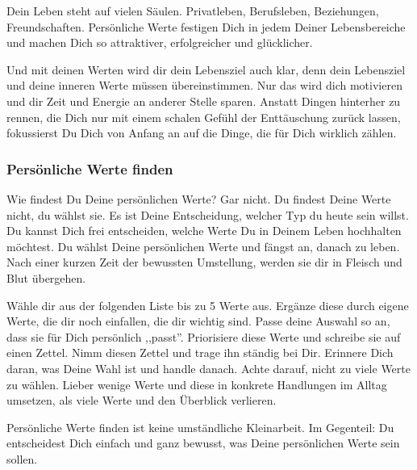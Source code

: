 \documentclass[../Lebensziel.tex]{subfiles}
\begin{document}
Dein Leben steht auf vielen Säulen. Privatleben, Berufsleben, Beziehungen, Freundschaften. Persönliche Werte festigen Dich in jedem Deiner Lebensbereiche und machen Dich so attraktiver, erfolgreicher und glücklicher.

Und mit deinen Werten wird dir dein Lebensziel auch klar, denn dein Lebensziel und deine inneren Werte müssen übereinstimmen. Nur das wird dich motivieren und dir Zeit und Energie an anderer Stelle sparen. Anstatt Dingen hinterher zu rennen, die Dich nur mit einem schalen Gefühl der Enttäuschung zurück lassen, fokussierst Du Dich von Anfang an auf die Dinge, die für Dich wirklich zählen.

\subsubsection{Persönliche Werte finden}
Wie findest Du Deine persönlichen Werte? Gar nicht. Du findest Deine Werte nicht, du wählst sie. Es ist Deine Entscheidung, welcher Typ du heute sein willst. Du kannst Dich frei entscheiden, welche Werte Du in Deinem Leben hochhalten möchtest. Du wählst Deine persönlichen Werte und fängst an, danach zu leben. Nach einer kurzen Zeit der bewussten Umstellung, werden sie dir in Fleisch und Blut übergehen.

Wähle dir aus der folgenden Liste bis zu 5 Werte aus. Ergänze diese durch eigene Werte, die dir noch einfallen, die dir wichtig sind. Passe deine Auswahl so an, dass sie für Dich persönlich ,,passt''. Priorisiere diese Werte und schreibe sie auf einen Zettel. Nimm diesen Zettel und trage ihn ständig bei Dir. Erinnere Dich daran, was Deine Wahl ist und handle danach. Achte darauf, nicht zu viele Werte zu wählen. Lieber wenige Werte und diese in konkrete Handlungen im Alltag umsetzen, als viele Werte und den Überblick verlieren.

Persönliche Werte finden ist keine umständliche Kleinarbeit. Im Gegenteil: Du entscheidest Dich einfach und ganz bewusst, was Deine persönlichen Werte sein sollen.
\end{document}
